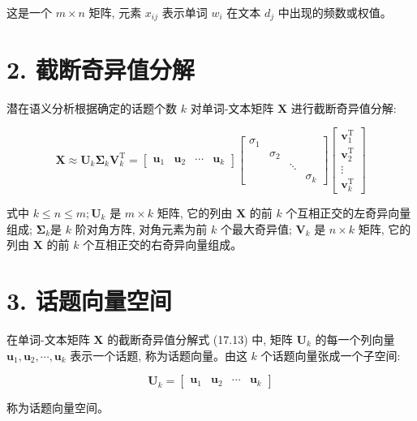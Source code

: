 \documentclass[10pt]{article}
\begin{document}
这是一个 $m \times n$ 矩阵, 元素 $x_{i j}$ 表示单词 $w_{i}$ 在文本 $d_{j}$ 中出现的频数或权值。

\section*{2. 截断奇异值分解}
潜在语义分析根据确定的话题个数 $k$ 对单词-文本矩阵 $\boldsymbol{X}$ 进行截断奇异值分解:

\[
\boldsymbol{X} \approx \boldsymbol{U}_{k} \boldsymbol{\Sigma}_{k} \boldsymbol{V}_{k}^{\mathrm{T}}=\left[\begin{array}{llll}
\boldsymbol{u}_{1} & \boldsymbol{u}_{2} & \cdots & \boldsymbol{u}_{k}
\end{array}\right]\left[\begin{array}{lllll}
\sigma_{1} & & &  \tag{17.13}\\
& \sigma_{2} & & \\
& & \ddots & \\
& & & \sigma_{k}
\end{array}\right]\left[\begin{array}{c}
\boldsymbol{v}_{1}^{\mathrm{T}} \\
\boldsymbol{v}_{2}^{\mathrm{T}} \\
\vdots \\
\boldsymbol{v}_{k}^{\mathrm{T}}
\end{array}\right]
\]

式中 $k \leqslant n \leqslant m ; \boldsymbol{U}_{k}$ 是 $m \times k$ 矩阵, 它的列由 $\boldsymbol{X}$ 的前 $k$ 个互相正交的左奇异向量组成; $\boldsymbol{\Sigma}_{k}$是 $k$ 阶对角方阵, 对角元素为前 $k$ 个最大奇异值; $\boldsymbol{V}_{k}$ 是 $n \times k$ 矩阵, 它的列由 $\boldsymbol{X}$ 的前 $k$ 个互相正交的右奇异向量组成。

\section*{3. 话题向量空间}
在单词-文本矩阵 $\boldsymbol{X}$ 的截断奇异值分解式 (17.13) 中, 矩阵 $\boldsymbol{U}_{k}$ 的每一个列向量 $\boldsymbol{u}_{1}, \boldsymbol{u}_{2}, \cdots, \boldsymbol{u}_{k}$ 表示一个话题, 称为话题向量。由这 $k$ 个话题向量张成一个子空间:

$$
\boldsymbol{U}_{k}=\left[\begin{array}{llll}
\boldsymbol{u}_{1} & \boldsymbol{u}_{2} & \cdots & \boldsymbol{u}_{k}
\end{array}\right]
$$

称为话题向量空间。
\end{document}
